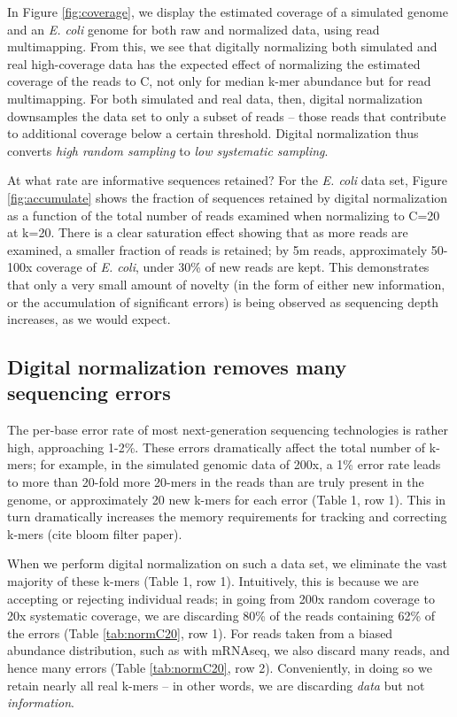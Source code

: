 \documentclass[10pt]{article}
\begin{document}
In Figure \ref{fig:coverage}, we display the estimated coverage of a
simulated genome and an {\em E. coli} genome for both raw and
normalized data, using read multimapping.  From this,
we see that digitally normalizing both simulated and real
high-coverage data has the expected effect of normalizing the
estimated coverage of the reads to C, not only for median k-mer
abundance but for read multimapping.  For both simulated and real
data, then, digital normalization downsamples the data set to only a
subset of reads -- those reads that contribute to additional coverage
below a certain threshold.  Digital normalization thus converts {\em
  high random sampling} to {\em low systematic sampling}.

At what rate are informative sequences retained?  For the {\em E. coli} data
set, Figure \ref{fig:accumulate} shows the fraction of sequences
retained by digital normalization as a function of the total number of
reads examined when normalizing to C=20 at k=20.  There is a clear
saturation effect showing that as more reads are examined, a smaller
fraction of reads is retained; by 5m reads, approximately 50-100x
coverage of {\em E. coli}, under 30\% of new reads are kept.  This
demonstrates that only a very small amount of novelty (in the form of
either new information, or the accumulation of significant errors) is
being observed as sequencing depth increases, as we would expect.


\subsection*{Digital normalization removes many sequencing errors}

The per-base error rate of most next-generation sequencing technologies
is rather high, approaching 1-2\%.  
These
errors dramatically affect the total number of k-mers; for example, in the
simulated genomic data of 200x, a 1\% error rate leads to more than
20-fold more 20-mers in the reads than are truly present in the genome,
or approximately 20 new k-mers for each error (Table 1, row 1).
This in turn dramatically increases the memory requirements for
tracking and correcting k-mers (cite bloom filter paper).

When we perform digital normalization on such a data set, we eliminate
the vast majority of these k-mers (Table 1, row 1).  Intuitively, this is
because we are accepting or rejecting individual reads; in going from
200x random coverage to 20x systematic coverage, we are discarding
80\% of the reads containing 62\% of the errors (Table \ref{tab:normC20}, row 1).
For reads taken from a biased abundance distribution, such as with
mRNAseq, we also discard many reads, and hence many errors (Table \ref{tab:normC20}, row 2).
Conveniently, in doing so we retain nearly all real k-mers -- in other words,
we are discarding {\em data} but not {\em information}.
\end{document}
